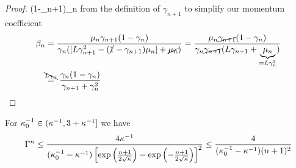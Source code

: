 \begin{proof}
	(1-\gamma_{n+1})\lbound_n\) from the definition of \(\gamma_{n+1}\) to simplify our
	momentum coefficient
	\begin{align*}
		\momCoeff_n
		&= \frac{\lbound_n \gamma_{n+1}(1-\gamma_n)}{
			\gamma_n([\ubound\gamma_{n+1}^2 - (\cancel{1}-\gamma_{n+1})\lbound_n] +\cancel{\lbound_n})
		}
		= \frac{\lbound_n\cancel{\gamma_{n+1}}(1-\gamma_n)}{
			\gamma_n\cancel{\gamma_{n+1}}(\ubound\gamma_{n+1} + \underbrace{\lbound_n}_{=\ubound\gamma_n^2})
		}\\
		&\lxeq{\bcancel{\ubound\gamma_n}} \frac{\gamma_n(1-\gamma_n)}{\gamma_{n+1} + \gamma_n^2}
		\qedhere
	\end{align*}
\end{proof}

\begin{lemma}
	\label{lem-appendix: convergence rate bounds for estimating sequences}
	For \(\kappa_0^{-1}\in (\kappa^{-1}, 3 + \kappa^{-1}]\) we have
	\begin{align*}
		\Gamma^n
		\le \frac{4\kappa^{-1}}{(\kappa_0^{-1}-\kappa^{-1})\left[
			\exp\left(\frac{n+1}{2\sqrt{\kappa}}\right)
			-\exp\left(-\frac{n+1}{2\sqrt{\kappa}}\right)
		\right]^2}
		\le \frac{4}{(\kappa_0^{-1}-\kappa^{-1})(n+1)^2}
	\end{align*}
\end{lemma}

